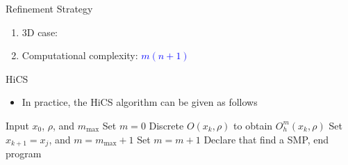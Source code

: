 \documentclass{beamer}
\newcommand{\bmx}{x}
\begin{document}
\begin{frame}{Refinement Strategy}
\begin{itemize}
\begin{enumerate}
\begin{figure}[!htbp]
	\label{fig:obset:sketch}
	\end{figure}
		\item 3D case:
	  \vspace{0.5cm}
	\item Computational complexity: \textcolor{blue}{$m(n+1)$}
	\end{enumerate}
\end{itemize}

\end{frame}


\begin{frame}{HiCS}

\begin{itemize}
	\item In practice, the HiCS algorithm can be given as follows
\end{itemize}

\begin{algorithm}[H]
\footnotesize{
	\caption{HiCS}
\begin{algorithmic}[1]
	\STATE Input $x_0$, $\rho$, and $m_{\max}$
		\STATE Set $m=0$
			\STATE Discrete $O(x_k,\rho)$ to obtain $O^m_h(x_k,\rho)$
				\STATE Set $x_{k+1}=x_j$, and $m=m_{\max}+1$
			\ELSE
				\STATE Set $m = m+1$
			\ENDIF
		\ELSE
			\STATE Declare that find a SMP, end program
		\ENDIF
	\ENDFOR
\end{algorithmic}
}
\end{algorithm}
\end{frame}
\end{document}
